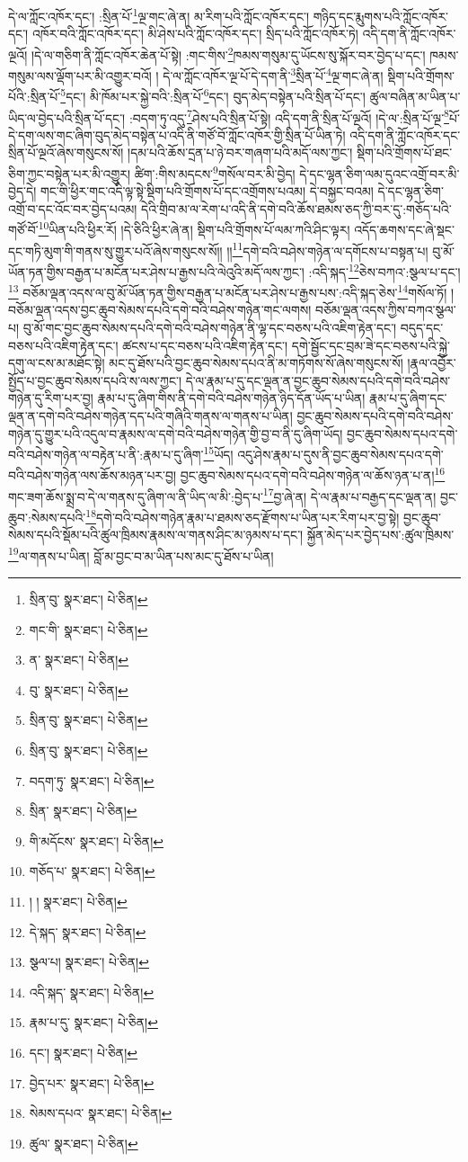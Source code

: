 དེ་ལ་ཀློང་འཁོར་དང་། :སྲིན་པོ་\footnote{སྲིན་བུ་  སྣར་ཐང་།  པེ་ཅིན། }ལྔ་གང་ཞེ་ན། མ་རིག་པའི་ཀློང་འཁོར་དང་། གཉིད་དང་རྨུགས་པའི་ཀློང་འཁོར་དང་། འཁོར་བའི་ཀློང་འཁོར་དང་། མི་ཤེས་པའི་ཀློང་འཁོར་དང་། སྲིད་པའི་ཀློང་འཁོར་ཏེ། འདི་དག་ནི་ཀློང་འཁོར་ལྔའོ། །དེ་ལ་གཅིག་ནི་ཀློང་འཁོར་ཆེན་པོ་སྟེ། :གང་གིས་\footnote{གང་གི་  སྣར་ཐང་།  པེ་ཅིན། }ཁམས་གསུམ་དུ་ཡོངས་སུ་སྐོར་བར་བྱེད་པ་དང་། ཁམས་གསུམ་ལས་ལྡོག་པར་མི་འགྱུར་བའོ། །
དེ་ལ་ཀློང་འཁོར་ལྔ་པོ་དེ་དག་ནི་\footnote{ན་  སྣར་ཐང་།  པེ་ཅིན། }སྲིན་པོ་\footnote{བུ་  སྣར་ཐང་།  པེ་ཅིན། }ལྔ་གང་ཞེ་ན། སྡིག་པའི་གྲོགས་པོའི་:སྲིན་པོ་\footnote{སྲིན་བུ་  སྣར་ཐང་།  པེ་ཅིན། }དང་། མི་ཁོམ་པར་སྐྱེ་བའི་:སྲིན་པོ་\footnote{སྲིན་བུ་  སྣར་ཐང་།  པེ་ཅིན། }དང་། བུད་མེད་བསྟེན་པའི་སྲིན་པོ་དང་། ཚུལ་བཞིན་མ་ཡིན་པ་ཡིད་ལ་བྱེད་པའི་སྲིན་པོ་དང་། :བདག་ཏུ་འདུ་\footnote{བདག་ཏུ་  སྣར་ཐང་།  པེ་ཅིན། }ཤེས་པའི་སྲིན་པོ་སྟེ། འདི་དག་ནི་སྲིན་པོ་ལྔའོ། །དེ་ལ་:སྲིན་པོ་ལྔ་\footnote{སྲིན་  སྣར་ཐང་།  པེ་ཅིན། }པོ་དེ་དག་ལས་གང་ཞིག་བུད་མེད་བསྟེན་པ་འདི་ནི་གཙོ་བོ་ཀློང་འཁོར་གྱི་སྲིན་པོ་ཡིན་ཏེ། འདི་དག་ནི་ཀློང་འཁོར་དང་སྲིན་པོ་ལྔའོ་ཞེས་གསུངས་སོ། །དམ་པའི་ཆོས་དྲན་པ་ཉེ་བར་གཞག་པའི་མདོ་ལས་ཀྱང་། སྡིག་པའི་གྲོགས་པོ་ཐང་ཅིག་ཀྱང་བསྟེན་པར་མི་འགྱུར། ཚིག་:གིས་མདངས་\footnote{གི་མདོངས་  སྣར་ཐང་།  པེ་ཅིན། }གསོལ་བར་མི་བྱེད། དེ་དང་ལྷན་ཅིག་ལམ་དུའང་འགྲོ་བར་མི་བྱེད་དེ། གང་གི་ཕྱིར་གང་འདི་ལྟ་སྟེ་སྡིག་པའི་གྲོགས་པོ་དང་འགྲོགས་པའམ། དེ་བསྐྱང་བའམ། དེ་དང་ལྷན་ཅིག་འགྲོ་བ་དང་འོང་བར་བྱེད་པའམ། དེའི་གྲིབ་མ་ལ་རེག་པ་འདི་ནི་དགེ་བའི་ཆོས་ཐམས་ཅད་ཀྱི་བར་དུ་:གཅོད་པའི་གཙོ་བོ་\footnote{གཅོད་པ་  སྣར་ཐང་།  པེ་ཅིན། }ཡིན་པའི་ཕྱིར་རོ། །དེ་ཅིའི་ཕྱིར་ཞེ་ན། སྡིག་པའི་གྲོགས་པོ་ལམ་ཀའི་ཤིང་ལྟར། འདོད་ཆགས་དང་ཞེ་སྡང་དང་གཏི་མུག་གི་གནས་སུ་གྱུར་པའོ་ཞེས་གསུངས་སོ།། །།\footnote{། །  སྣར་ཐང་།  པེ་ཅིན། }དགེ་བའི་བཤེས་གཉེན་ལ་དགོངས་པ་བསྟན་པ། བུ་མོ་ཡོན་ཏན་གྱིས་བརྒྱན་པ་མངོན་པར་ཤེས་པ་རྒྱས་པའི་ལེའུའི་མདོ་ལས་ཀྱང་། :འདི་སྐད་\footnote{དེ་སྐད་  སྣར་ཐང་།  པེ་ཅིན། }ཅེས་བཀའ་:སྩལ་པ་དང་།\footnote{སྩལ་པ།  སྣར་ཐང་།  པེ་ཅིན། } བཅོམ་ལྡན་འདས་ལ་བུ་མོ་ཡོན་ཏན་གྱིས་བརྒྱན་པ་མངོན་པར་ཤེས་པ་རྒྱས་པས་:འདི་སྐད་ཅེས་\footnote{འདི་སྐད་  སྣར་ཐང་།  པེ་ཅིན། }གསོལ་ཏོ། །བཅོམ་ལྡན་འདས་བྱང་ཆུབ་སེམས་དཔའི་དགེ་བའི་བཤེས་གཉེན་གང་ལགས། བཅོམ་ལྡན་འདས་ཀྱིས་བཀའ་སྩལ་པ། བུ་མོ་གང་བྱང་ཆུབ་སེམས་དཔའི་དགེ་བའི་བཤེས་གཉེན་ནི་ལྷ་དང་བཅས་པའི་འཇིག་རྟེན་དང་། བདུད་དང་བཅས་པའི་འཇིག་རྟེན་དང་། ཚངས་པ་དང་བཅས་པའི་འཇིག་རྟེན་དང་། དགེ་སྦྱོང་དང་བྲམ་ཟེ་དང་བཅས་པའི་སྐྱེ་དགུ་ལ་ངས་མ་མཐོང་སྟེ། མང་དུ་ཐོས་པའི་བྱང་ཆུབ་སེམས་དཔའ་ནི་མ་གཏོགས་སོ་ཞེས་གསུངས་སོ། །རྣལ་འབྱོར་སྤྱོད་པ་བྱང་ཆུབ་སེམས་དཔའི་ས་ལས་ཀྱང་། དེ་ལ་རྣམ་པ་དུ་དང་ལྡན་ན་བྱང་ཆུབ་སེམས་དཔའི་དགེ་བའི་བཤེས་གཉེན་དུ་རིག་པར་བྱ། རྣམ་པ་དུ་ཞིག་གིས་ནི་དགེ་བའི་བཤེས་གཉེན་ཉིད་དོན་ཡོད་པ་ཡིན། རྣམ་པ་དུ་ཞིག་དང་ལྡན་ན་དགེ་བའི་བཤེས་གཉེན་དད་པའི་གཞིའི་གནས་ལ་གནས་པ་ཡིན། བྱང་ཆུབ་སེམས་དཔའི་དགེ་བའི་བཤེས་གཉེན་དུ་གྱུར་པའི་འདུལ་བ་རྣམས་ལ་དགེ་བའི་བཤེས་གཉེན་གྱི་བྱ་བ་ནི་དུ་ཞིག་ཡོད། བྱང་ཆུབ་སེམས་དཔའ་དགེ་བའི་བཤེས་གཉེན་ལ་བརྟེན་པ་ནི་:རྣམ་པ་དུ་ཞིག་\footnote{རྣམ་པ་དུ་  སྣར་ཐང་།  པེ་ཅིན། }ཡོད། འདུ་ཤེས་རྣམ་པ་དུས་ནི་བྱང་ཆུབ་སེམས་དཔའ་དགེ་བའི་བཤེས་གཉེན་ལས་ཆོས་མཉན་པར་བྱ། བྱང་ཆུབ་སེམས་དཔའ་དགེ་བའི་བཤེས་གཉེན་ལ་ཆོས་ཉན་པ་ན།\footnote{དང་།  སྣར་ཐང་།  པེ་ཅིན། } གང་ཟག་ཆོས་སྨྲ་བ་དེ་ལ་གནས་དུ་ཞིག་ལ་ནི་ཡིད་ལ་མི་:བྱེད་པ་\footnote{བྱེད་པར་  སྣར་ཐང་།  པེ་ཅིན། }བྱ་ཞེ་ན། དེ་ལ་རྣམ་པ་བརྒྱད་དང་ལྡན་ན། བྱང་ཆུབ་:སེམས་དཔའི་\footnote{སེམས་དཔའ་  སྣར་ཐང་།  པེ་ཅིན། }དགེ་བའི་བཤེས་གཉེན་རྣམ་པ་ཐམས་ཅད་རྫོགས་པ་ཡིན་པར་རིག་པར་བྱ་སྟེ། བྱང་ཆུབ་སེམས་དཔའི་སྡོམ་པའི་ཚུལ་ཁྲིམས་རྣམས་ལ་གནས་ཤིང་མ་ཉམས་པ་དང་། སྐྱོན་མེད་པར་བྱེད་པས་:ཚུལ་ཁྲིམས་\footnote{ཚུལ་  སྣར་ཐང་།  པེ་ཅིན། }ལ་གནས་པ་ཡིན། བློ་མ་བྱང་བ་མ་ཡིན་པས་མང་དུ་ཐོས་པ་ཡིན། 
